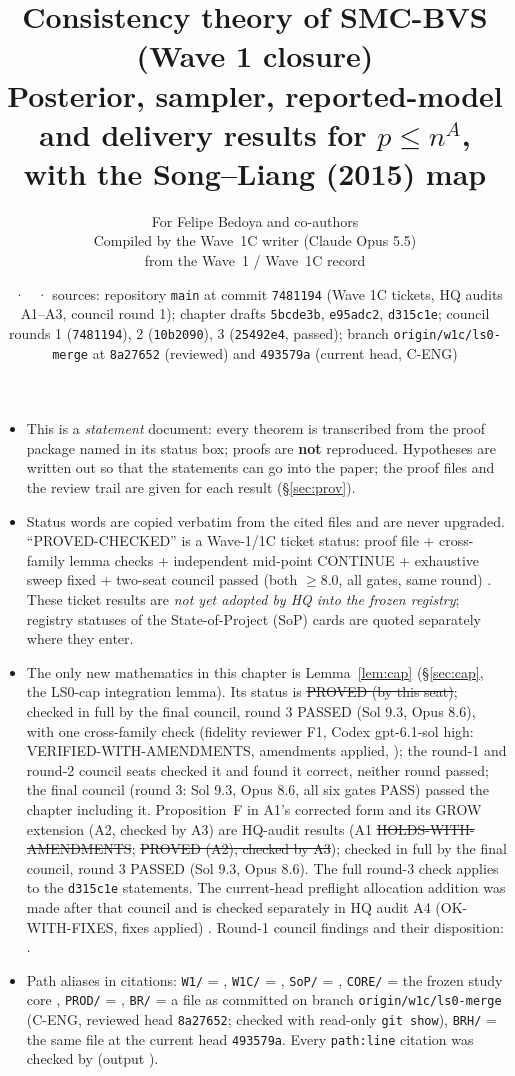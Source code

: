 \documentclass[11pt]{article}
\title{\textbf{Consistency theory of SMC-BVS (Wave 1 closure)}\\[4pt]
\large Posterior, sampler, reported-model and delivery results for $p\le n^A$, with the Song--Liang (2015) map}
\author{For Felipe Bedoya and co-authors\\[2pt]
\small Compiled by the Wave~1C writer (Claude Opus 5.5)\\
\small from the Wave~1 / Wave~1C record}
\date{\sopversion\ · \sopdate\ · sources: repository \texttt{main} at commit \texttt{7481194} (Wave 1C tickets, HQ audits A1--A3, council round 1); chapter drafts \texttt{5bcde3b}, \texttt{e95adc2}, \texttt{d315c1e}; council rounds 1 (\texttt{7481194}), 2 (\texttt{10b2090}), 3 (\texttt{25492e4}, passed); branch \texttt{origin/w1c/ls0-merge} at \texttt{8a27652} (reviewed) and \texttt{493579a} (current head, C-ENG)}
\begin{document}
\maketitle
\thispagestyle{fancy}

\begin{agentnote}
\begin{itemize}
\item This is a \emph{statement} document: every theorem is transcribed from the proof package named in its status box; proofs are \textbf{not} reproduced. Hypotheses are written out so that the statements can go into the paper; the proof files and the review trail are given for each result (§\ref{sec:prov}).
\item Status words are copied verbatim from the cited files and are never upgraded. ``PROVED-CHECKED'' is a Wave-1/1C ticket status: proof file + cross-family lemma checks + independent mid-point CONTINUE + exhaustive sweep fixed + two-seat council passed (both $\ge8.0$, all gates, same round) . These ticket results are \emph{not yet adopted by HQ into the frozen registry}; registry statuses of the State-of-Project (SoP) cards are quoted separately where they enter.
\item The only new mathematics in this chapter is Lemma~\ref{lem:cap} (§\ref{sec:cap}, the LS0-cap integration lemma). Its status is \st{PROVED (by this seat)}; checked in full by the final council, round 3 PASSED (Sol 9.3, Opus 8.6), with one cross-family check (fidelity reviewer F1, Codex gpt-6.1-sol high: VERIFIED-WITH-AMENDMENTS, amendments applied, ); the round-1 and round-2 council seats checked it and found it correct, neither round passed; the final council (round 3: Sol 9.3, Opus 8.6, all six gates PASS) passed the chapter including it. Proposition~F in A1\textquoteright s corrected form and its GROW extension (A2, checked by A3) are HQ-audit results (A1 \st{HOLDS-WITH-AMENDMENTS}; \st{PROVED (A2), checked by A3}); checked in full by the final council, round 3 PASSED (Sol 9.3, Opus 8.6). The full round-3 check applies to the \texttt{d315c1e} statements. The current-head preflight allocation addition was made after that council and is checked separately in HQ audit A4 (OK-WITH-FIXES, fixes applied) . Round-1 council findings and their disposition: .
\item Path aliases in citations: \texttt{W1/} = , \texttt{W1C/} = , \texttt{SoP/} = , \texttt{CORE/} = the frozen study core , \texttt{PROD/} = , \texttt{BR/} = a file as committed on branch \texttt{origin/w1c/ls0-merge} (C-ENG, reviewed head \texttt{8a27652}; checked with read-only \texttt{git show}), \texttt{BRH/} = the same file at the current head \texttt{493579a}. Every \texttt{path:line} citation was checked by  (output ).

\end{itemize}
\end{agentnote}
\end{document}

